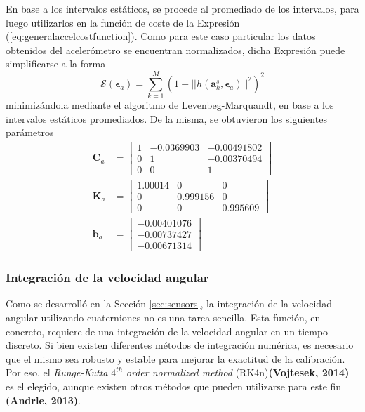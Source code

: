 En base a los intervalos estáticos, se procede al promediado de los intervalos, para luego utilizarlos en la función de coste de la Expresión (\ref{eq:generalaccelcostfunction}). Como para este caso particular los datos obtenidos del acelerómetro se encuentran normalizados, dicha Expresión puede simplificarse a la forma
\begin{equation}
    \mathscr{S}(\bm{\epsilon}_{a}) = \sum_{k=1}^M(1-||h(\bm{a}^s_k,\bm{\epsilon}_{a})||^2)^2
    \label{eq:mpu9250accelcostfunction}
\end{equation}
minimizándola mediante el algoritmo de Levenbeg-Marquandt, en base a los intervalos estáticos promediados. De la misma, se obtuvieron los siguientes parámetros
\begin{align}
        \bm{C}_a &=
    \begin{bmatrix}
        1 & -0.0369903 & -0.00491802 \\
        0 & 1 & -0.00370494 \\
        0 & 0 & 1
    \end{bmatrix}
    \\
        \bm{K}_a &=
    \begin{bmatrix}
        1.00014 & 0 & 0 \\
        0 & 0.999156 & 0 \\
        0 & 0 & 0.995609
    \end{bmatrix}
    \\
    \bm{b}_a &=
    \begin{bmatrix}
        -0.00401076 \\
        -0.00737427 \\
        -0.00671314
    \end{bmatrix}
\end{align}

\subsubsection{Integración de la velocidad angular}
Como se desarrolló en la Sección \ref{sec:sensors}, la integración de la velocidad angular utilizando cuaterniones no es una tarea sencilla.
Esta función, en concreto, requiere de una integración de la velocidad angular en un tiempo discreto. Si bien existen diferentes métodos de integración numérica, es necesario que el mismo sea robusto y estable para mejorar la exactitud de la calibración. Por eso, el \textit{Runge-Kutta} $4^{th}$ \textit{order normalized method} (RK4n)\textbf{(Vojtesek, 2014)} es el elegido, aunque existen otros métodos que pueden utilizarse para este fin \textbf{(Andrle, 2013)}.

